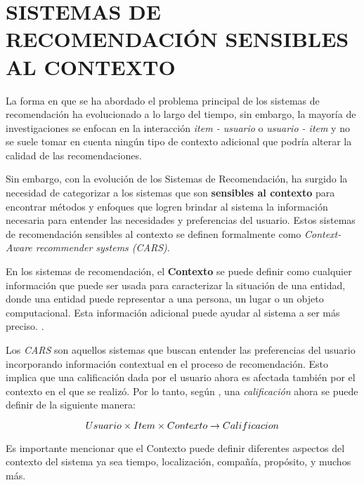 \section{SISTEMAS DE RECOMENDACIÓN SENSIBLES AL CONTEXTO}

La forma en que se ha abordado el problema principal de los sistemas de recomendación ha evolucionado a lo largo del tiempo, sin embargo, la mayoría de investigaciones se enfocan en la interacción \textit{item - usuario} o \textit{usuario - item} y no se suele tomar en cuenta ningún tipo de contexto adicional que podría alterar la calidad de las recomendaciones.

Sin embargo, con la evolución de los Sistemas de Recomendación, ha surgido la necesidad de categorizar a los sistemas que son \textbf{sensibles al contexto} para encontrar métodos y enfoques que logren brindar al sistema la información necesaria para entender las necesidades y preferencias del usuario. Estos sistemas de recomendación sensibles al contexto se definen formalmente como \textit{Context-Aware recommender systems (CARS)}. 

\begin{definition}

En los sistemas de recomendación, el \textbf{Contexto} se puede definir como cualquier información que puede ser usada para caracterizar la situación de una entidad, donde una entidad puede representar a una persona, un lugar o un objeto computacional. Esta información adicional puede ayudar al sistema a ser más preciso. \mbox{\parencite{mateos2024systematic}}.

\end{definition}

Los \textit{CARS} son aquellos sistemas que buscan entender las preferencias del usuario incorporando información contextual en el proceso de recomendación. Esto implica que una calificación dada por el usuario ahora es afectada también por el contexto en el que se realizó. Por lo tanto, según \parencite{10.5555/1941884}, una \textit{calificación} ahora se puede definir de la siguiente manera:

\begin{equation}
    Usuario \times Item \times Contexto \rightarrow Calificacion
    \addequation{Cálculo de Calificación mediante un Contexto}
\end{equation}

Es importante mencionar que el Contexto puede definir diferentes aspectos del contexto del sistema ya sea tiempo, localización, compañía, propósito, y muchos más. 

